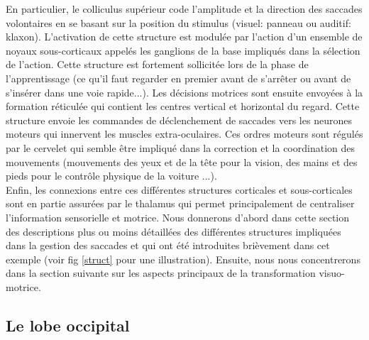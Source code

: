 En particulier, le colliculus supérieur code l'amplitude et la direction des saccades volontaires en se basant sur la position du stimulus (visuel: panneau ou auditif: klaxon). L'activation de cette structure est modulée par l'action d'un ensemble de noyaux sous-corticaux appelés les ganglions de la base impliqués dans la sélection de l'action. Cette structure est fortement sollicitée lors de la phase de l'apprentissage (ce qu'il faut regarder en premier avant de s'arrêter ou avant de s'insérer dans une voie rapide...). Les décisions motrices sont ensuite envoyées à la formation réticulée qui contient les centres vertical et horizontal du regard. Cette structure envoie les commandes de déclenchement de saccades vers les neurones moteurs qui innervent les muscles extra-oculaires. Ces ordres moteurs sont régulés par le cervelet qui semble être impliqué dans la correction et la coordination des mouvements (mouvements des yeux et de la tête pour la vision, des mains et des pieds pour le contrôle physique de la voiture ...).\\

Enfin, les connexions entre ces différentes structures corticales et sous-corticales sont en partie assurées par le thalamus qui permet principalement de centraliser l'information sensorielle et motrice. Nous donnerons d'abord dans cette section des descriptions plus ou moins détaillées des différentes structures impliquées dans la gestion des saccades et qui ont été introduites brièvement dans cet exemple (voir fig \ref{struct} pour une illustration). Ensuite, nous nous concentrerons dans la section suivante sur les aspects principaux de la transformation visuo-motrice.

\subsection{Le lobe occipital}

